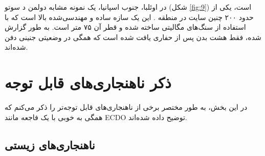 \documentclass[10pt,twocolumn,letterpaper]{article}
\begin{document}
در اوئلبا، جنوب اسپانیا، یک نمونه مشابه دولمن د سوتو (شکل \ref{fig:9}) است، یکی از حدود ۲۰۰ چنین سایت در منطقه \cite{72,32}. این یک سازه ساده و مهندسی‌شده بالا است که با استفاده از سنگ‌های مگالیتی ساخته شده و قطر آن ۷۵ متر است. به طور گزارش شده، فقط هشت بدن پس از حفاری یافت شده است که همگی در وضعیتی جنینی دفن شده‌اند.

\section{ذکر ناهنجاری‌های قابل توجه}

در این بخش، به طور مختصر برخی از ناهنجاری‌های قابل توجه‌تر را ذکر می‌کنم که همگی به خوبی با یک فاجعه مانند ECDO توضیح داده شده‌اند.

\subsection{ناهنجاری‌های زیستی}
\end{document}

